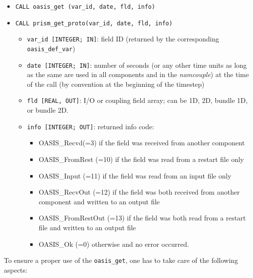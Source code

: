 \begin{itemize}
 
\item {\tt CALL oasis\_get (var\_id, date, fld, info)}
\item {\tt CALL prism\_get\_proto(var\_id, date, fld, info)}
  \begin{itemize}
  \item {\tt var\_id [INTEGER; IN]}: field ID (returned by the corresponding
    {\tt oasis\_def\_var})
  \item {\tt date [INTEGER; IN]}: number of seconds (or any other time
    units as long as the same are used in all components and in the {\it
      namcouple}) at the time of the call (by convention at the
    beginning of the timestep)
  \item {\tt fld [REAL, OUT]}: I/O or coupling field array;  
    can be 1D, 2D, bundle 1D, or bundle 2D.
  \item {\tt info [INTEGER; OUT]}: returned info code:
    \begin{itemize}
    \item OASIS\_Recvd(=3) if the field was received from another
      component
    \item OASIS\_FromRest (=10) if the field was read from a restart
      file only
    \item OASIS\_Input (=11) if the field was read from an input file
      only
    \item OASIS\_RecvOut (=12) if the field was both received from
      another component and written to an output file
    \item OASIS\_FromRestOut (=13) if the field was both read from a
      restart file and written to an output file
    \item OASIS\_Ok (=0) otherwise and no error occurred.
    \end{itemize}
  \end{itemize}
\end{itemize}

To ensure a proper use of the {\tt oasis\_get}, one has to take care of the following aspects:

